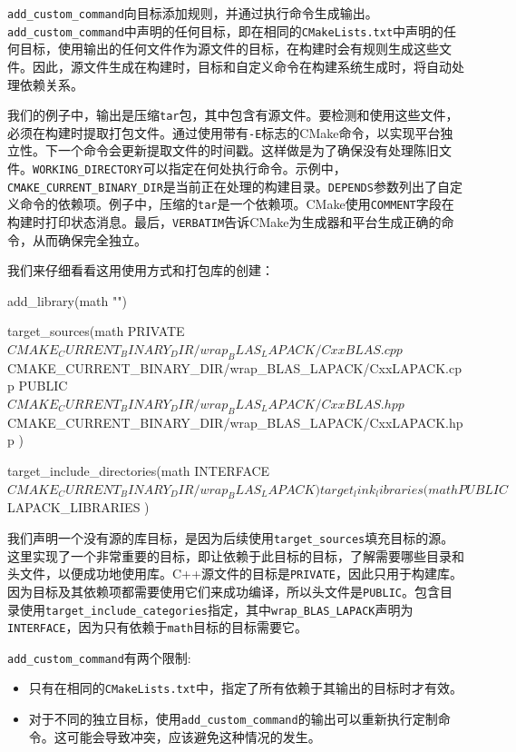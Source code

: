 \texttt{add\_custom\_command}向目标添加规则，并通过执行命令生成输出。\texttt{add\_custom\_command}中声明的任何目标，即在相同的\texttt{CMakeLists.txt}中声明的任何目标，使用输出的任何文件作为源文件的目标，在构建时会有规则生成这些文件。因此，源文件生成在构建时，目标和自定义命令在构建系统生成时，将自动处理依赖关系。

我们的例子中，输出是压缩\texttt{tar}包，其中包含有源文件。要检测和使用这些文件，必须在构建时提取打包文件。通过使用带有\texttt{-E}标志的CMake命令，以实现平台独立性。下一个命令会更新提取文件的时间戳。这样做是为了确保没有处理陈旧文件。\texttt{WORKING\_DIRECTORY}可以指定在何处执行命令。示例中，\texttt{CMAKE\_CURRENT\_BINARY\_DIR}是当前正在处理的构建目录。\texttt{DEPENDS}参数列出了自定义命令的依赖项。例子中，压缩的\texttt{tar}是一个依赖项。CMake使用\texttt{COMMENT}字段在构建时打印状态消息。最后，\texttt{VERBATIM}告诉CMake为生成器和平台生成正确的命令，从而确保完全独立。

我们来仔细看看这用使用方式和打包库的创建：

\begin{codebox}[cmake]
add_library(math "")

target_sources(math
  PRIVATE
    ${CMAKE_CURRENT_BINARY_DIR}/wrap_BLAS_LAPACK/CxxBLAS.cpp
    ${CMAKE_CURRENT_BINARY_DIR}/wrap_BLAS_LAPACK/CxxLAPACK.cpp
  PUBLIC
    ${CMAKE_CURRENT_BINARY_DIR}/wrap_BLAS_LAPACK/CxxBLAS.hpp
    ${CMAKE_CURRENT_BINARY_DIR}/wrap_BLAS_LAPACK/CxxLAPACK.hpp
  )
  
target_include_directories(math
  INTERFACE
    ${CMAKE_CURRENT_BINARY_DIR}/wrap_BLAS_LAPACK
  )
  
target_link_libraries(math
  PUBLIC
    ${LAPACK_LIBRARIES}
  )
\end{codebox}

我们声明一个没有源的库目标，是因为后续使用\texttt{target\_sources}填充目标的源。这里实现了一个非常重要的目标，即让依赖于此目标的目标，了解需要哪些目录和头文件，以便成功地使用库。C++源文件的目标是\texttt{PRIVATE}，因此只用于构建库。因为目标及其依赖项都需要使用它们来成功编译，所以头文件是\texttt{PUBLIC}。包含目录使用\texttt{target\_include\_categories}指定，其中\texttt{wrap\_BLAS\_LAPACK}声明为\texttt{INTERFACE}，因为只有依赖于\texttt{math}目标的目标需要它。

\texttt{add\_custom\_command}有两个限制:

\begin{itemize}
\item 只有在相同的\texttt{CMakeLists.txt}中，指定了所有依赖于其输出的目标时才有效。

\item 对于不同的独立目标，使用\texttt{add\_custom\_command}的输出可以重新执行定制命令。这可能会导致冲突，应该避免这种情况的发生。

\end{itemize}

